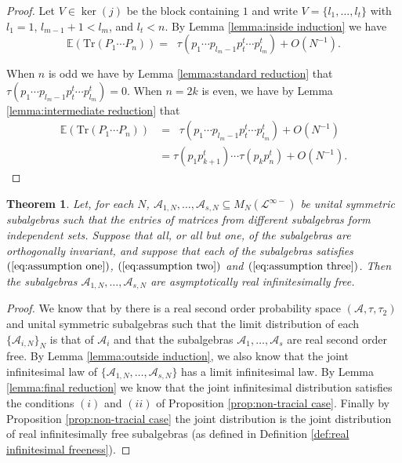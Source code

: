 \documentclass[11pt]{amsart}
\newtheorem{theorem}{Theorem}
\theoremstyle{definition}
\numberwithin{theorem}{section}
\newcommand{\cA}{\mathcal{A}}
\newcommand{\cL}{\mathcal{L}}
\newcommand{\sN}{{\scriptscriptstyle N}}
\newcommand{\rE} {\mathbb{E}}
\newcommand{\Tr}{\mathrm{Tr}}
\begin{document}
\begin{proof}
Let $V \in \ker(j)$ be the block containing $1$ and write $V
= \{ l_1, \dots, l_t\}$ with $l_1 = 1$, $l_{m-1}+1 < l_m$,
and $l_t < n$. By Lemma \ref{lemma:inside induction} we have
\[
\rE(\Tr(P_1 \cdots P_n))
=
\mathop{\sum_{m=2}^{t}}
\tau(p_1 \cdots p_{l_m-1} p_t^t \cdots p_{l_m}^t )  + O(N^{-1}).
\] 

When $n$ is odd we have by Lemma \ref{lemma:standard
  reduction} that $\tau(p_1 \cdots p_{l_m-1} p_t^t \cdots
p_{l_m}^t ) = 0$. When $n = 2k$ is even, we have by Lemma
\ref{lemma:intermediate reduction} that
\begin{align*}
\rE(\Tr(P_1 \cdots P_n))
& =
\mathop{\sum_{m=2}^{t}}
\tau(p_1 \cdots p_{l_m-1} p_t^t \cdots p_{l_m}^t )  + O(N^{-1})  \\
& \mbox{} = 
\tau(p_1 p_{k+1}^t) \cdots \tau(p_k p_{n}^t) + O(N^{-1}).
\end{align*}
\end{proof}

\begin{theorem}\label{thm:asymptotic real infinitesimal freeness}
Let, for each $N$, $\cA_{1, \sN}, \dots, \cA_{s, \sN}
\subseteq M_N(\cL^{\infty-})$ be unital symmetric
subalgebras such that the entries of matrices from different
subalgebras form independent sets. Suppose that all, or all
but one, of the subalgebras are orthogonally invariant, and
suppose that each of the subalgebras satisfies
$(\ref{eq:assumption one})$, $(\ref{eq:assumption two})$ and
$(\ref{eq:assumption three})$. Then the subalgebras $\cA_{1,
  \sN}, \dots, \cA_{s, \sN}$ are asymptotically real
infinitesimally free.
\end{theorem}


\begin{proof}
We know that by \cite[Thm. 54]{mp} there is a real second
order probability space $(\cA, \tau, \tau_2)$ and unital
symmetric subalgebras such that the limit distribution of
each $\{ \cA_{i, \sN} \}_\sN$ is that of $\cA_i$ and that
the subalgebras $\cA_1, \dots, \cA_s$ are real second order
free. By Lemma \ref{lemma:outside induction}, we also know
that the joint infinitesimal law of $\{\cA_{1, \sN}, \dots,
\cA_{s, \sN}\}$ has a limit infinitesimal law. By Lemma
\ref{lemma:final reduction} we know that the joint
infinitesimal distribution satisfies the conditions $(i)$
and $(ii)$ of Proposition \ref{prop:non-tracial
  case}. Finally by Proposition \ref{prop:non-tracial case}
the joint distribution is the joint distribution of real
infinitesimally free subalgebras (as defined in Definition
\ref{def:real infinitesimal freeness}).
\end{proof}
\end{document}
